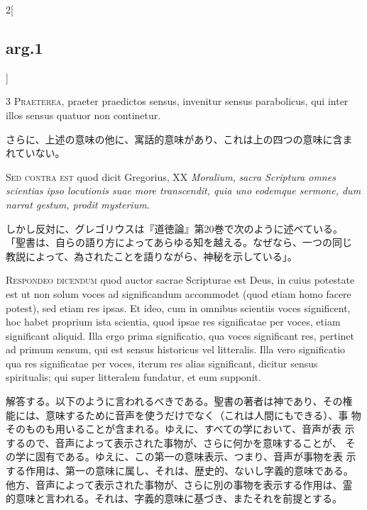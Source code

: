 \documentclass[
paper=a4paper,
fontsize=10pt,
jafontsize=9pt,
titlepage
]{jlreq}
\begin{document}
\begin{paracol}{2}[\subsection{arg.1}]

{\scshape 3 Praeterea}, praeter praedictos sensus, invenitur sensus
parabolicus, qui inter illos sensus quatuor non continetur.

\switchcolumn

さらに、上述の意味の他に、寓話的意味があり、これは上の四つの意味に含ま
れていない。

\switchcolumn*[\subsection{s.c.}]

{\scshape Sed contra est} quod dicit Gregorius, XX {\itshape
Moralium}, {\itshape sacra Scriptura omnes scientias ipso locutionis
suae more transcendit, quia uno eodemque sermone, dum narrat gestum,
prodit mysterium}.

\switchcolumn

しかし反対に、グレゴリウスは『道徳論』第20巻で次のように述べている。
「聖書は、自らの語り方によってあらゆる知を越える。なぜなら、一つの同じ
教説によって、為されたことを語りながら、神秘を示している」。


{\scshape Respondeo dicendum} quod auctor sacrae Scripturae est Deus,
in cuius potestate est ut non solum voces ad significandum accommodet
(quod etiam homo facere potest), sed etiam res ipsas. Et ideo, cum in
omnibus scientiis voces significent, hoc habet proprium ista scientia,
quod ipsae res significatae per voces, etiam significant aliquid. Illa
ergo prima significatio, qua voces significant res, pertinet ad primum
sensum, qui est sensus historicus vel litteralis. Illa vero
significatio qua res significatae per voces, iterum res alias
significant, dicitur sensus spiritualis; qui super litteralem
fundatur, et eum supponit.

\switchcolumn

解答する。以下のように言われるべきである。聖書の著者は神であり、その権
能には、意味するために音声を使うだけでなく（これは人間にもできる）、事
物そのものも用いることが含まれる。ゆえに、すべての学において、音声が表
示するので、音声によって表示された事物が、さらに何かを意味することが、
その学に固有である。ゆえに、この第一の意味表示、つまり、音声が事物を表
示する作用は、第一の意味に属し、それは、歴史的、ないし字義的意味である。
他方、音声によって表示された事物が、さらに別の事物を表示する作用は、霊
的意味と言われる。それは、字義的意味に基づき、またそれを前提とする。


\end{paracol}
\end{document}
